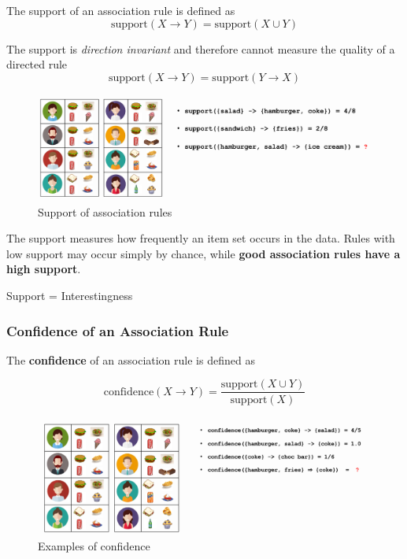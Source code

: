 \documentclass[11pt]{article}
\begin{document}
The support of an association rule is defined as
\begin{equation*}
    \text{support}(X\rightarrow Y) = \text{support}(X\cup Y)
\end{equation*}

The support is \emph{direction invariant} and therefore cannot measure the quality of a directed rule
\begin{equation*}
    \text{support}(X\rightarrow Y) = \text{support}(Y\rightarrow X)
\end{equation*}

\begin{figure}[tbh!]
    \centering
    \includegraphics[width=0.7\linewidth, keepaspectratio]{Pictures/support_association_rule}
    \caption{Support of association rules}
    \label{fig:supportassociationrule}
\end{figure}

The support measures how frequently an item set occurs in the data. Rules with low support may occur simply by chance, while \textbf{good association rules have a high support}.

\begin{theorem}
    Support = Interestingness
\end{theorem}

\subsubsection{Confidence of an Association Rule}

The \textbf{confidence} of an association rule is defined as

\begin{equation*}
    \text{confidence}(X\rightarrow Y) = \frac{\text{support}(X\cup Y)}{\text{support}(X)}
\end{equation*}

\begin{figure}[tbh!]
    \centering
    \includegraphics[width=0.7\linewidth, keepaspectratio]{Pictures/confidence_association_rule}
    \caption{Examples of confidence}
    \label{fig:confidenceassociationrule}
\end{figure}
\end{document}
